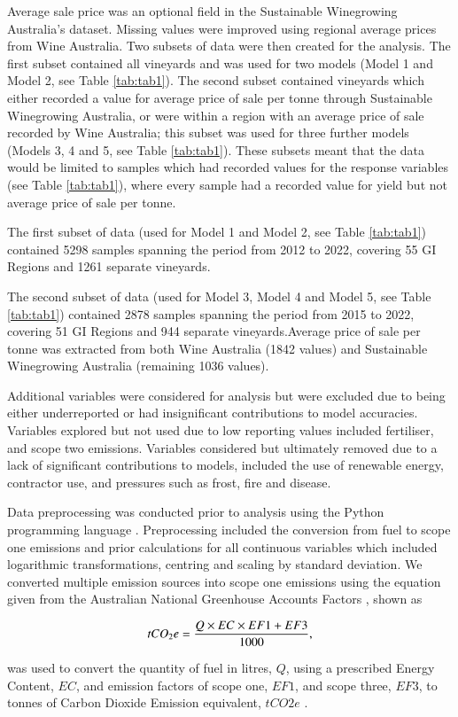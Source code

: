 \documentclass[review,12pt,authoryear]{elsarticle}
\begin{document}
\begin{linenumbers}
Average sale price was an optional field in the Sustainable Winegrowing Australia's dataset. Missing values were improved using regional average prices from Wine Australia. Two subsets of data were then created for the analysis. The first subset contained all vineyards and was used for two models (Model 1 and Model 2, see Table \ref{tab:tab1}). The second subset contained vineyards which either recorded a value for average price of sale per tonne through Sustainable Winegrowing Australia, or were within a region with an average price of sale recorded by Wine Australia; this subset was used for three further models (Models 3, 4 and 5, see Table \ref{tab:tab1}). These subsets meant that the data would be limited to samples which had recorded values for the response variables (see Table \ref{tab:tab1}), where every sample had a recorded value for yield but not average price of sale per tonne.
\par
The first subset of data (used for Model 1 and Model 2, see Table \ref{tab:tab1}) contained 5298 samples spanning the period from 2012 to 2022, covering 55 GI Regions and 1261 separate vineyards.
\par
The second subset of data (used for Model 3, Model 4 and Model 5, see Table \ref{tab:tab1}) contained 2878 samples spanning the period from 2015 to 2022, covering 51 GI Regions and 944 separate vineyards.Average price of sale per tonne was extracted from both Wine Australia (1842 values) and Sustainable Winegrowing Australia (remaining 1036 values).
\par
Additional variables were considered for analysis but were excluded due to being either underreported or had insignificant contributions to model accuracies. Variables explored but not used due to low reporting values included fertiliser, and scope two emissions. Variables considered but ultimately removed due to a lack of significant contributions to models, included the use of renewable energy, contractor use, and pressures such as frost, fire and disease.
\par
Data preprocessing was conducted prior to analysis using the Python programming language \citep{g.vanrossumPythonTutorialTechnical1995}. Preprocessing included the conversion from fuel to scope one emissions and prior calculations for all continuous variables which included logarithmic transformations, centring and scaling by standard deviation. 
We converted multiple emission sources into scope one emissions using the equation given from the Australian National Greenhouse Accounts Factors \citep{agdeeNationalGreenhouseAccounts2021}, shown as
\par
\begin{equation}
\label{(1)}
    tCO_{2}e={{Q \times EC \times EF1 + EF3}\over{1000}},
\end{equation}
\par
was used to convert the quantity of fuel in litres, $Q$, using a prescribed Energy Content, $EC$, and emission factors of scope one, $EF1$, and scope three, $EF3$, to tonnes of Carbon Dioxide Emission equivalent, $tCO2e$ \citep{departmentofclimatechangeenergytheenvironmentandwaterAustralianNationalGreenhouse2022}.
\par


\end{linenumbers}
\end{document}
